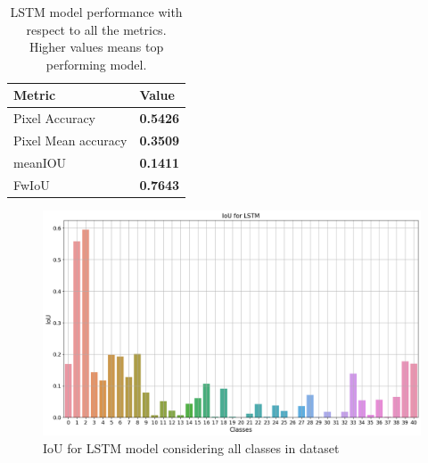 	\begin{table}
	\begin{center}
		\begin{tabular}{ | l | p{12cm} |}
			\hline		
			\cellcolor{purple!30}Metric & \cellcolor{purple!30}Value \\ \hline
			Pixel Accuracy & { \bf 0.5426 }  \\ \hline
			Pixel Mean accuracy & { \bf 0.3509 }   \\ \hline
			meanIOU & { \bf 0.1411 }  \\ \hline
			FwIoU & { \bf 0.7643 }  \\ \hline
			\hline
		\end{tabular}
		\caption{LSTM model performance with respect to all the metrics. Higher values means top performing model.}
		\label{tab:caption}
	\end{center}
	\end{table}
	
	\begin{figure}
		\centering
		\includegraphics[width=13cm]{images/iou_lstm_scannet_all_classes.png}
		\caption{IoU for LSTM model considering all classes in dataset}
		\label{fig:scannet_class}
	\end{figure} 


